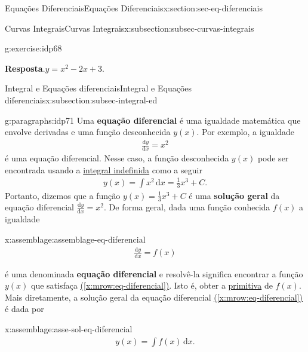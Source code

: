 \documentclass[oneside,10pt,]{article}
\newcommand{\blocktitlefont}{\relax}
\newcommand{\xreffont}{\relax}
\newcommand{\terminology}[1]{\textbf{#1}}
\numberwithin{equation}{section}
\newcommand{\dd}{\mathrm{d}}
\newcommand{\integral}[2]{\displaystyle\int {#1}\,\dd {#2}}
\begin{document}
\begin{sectionptx}{Equações Diferenciais}{}{Equações Diferenciais}{}{}{x:section:sec-eq-diferenciais}
\begin{subsectionptx}{Curvas Integrais}{}{Curvas Integrais}{}{}{x:subsection:subsec-curvas-integrais}
\begin{inlineexercise}{}{g:exercise:idp68}
\par\smallskip%
\noindent\textbf{\blocktitlefont Resposta}.\hypertarget{g:answer:idp70}{}\quad{}\(y=x^2-2x+3\).%
\end{inlineexercise}%
\end{subsectionptx}
%
%
\typeout{************************************************}
\typeout{************************************************}
%
\begin{subsectionptx}{Integral e Equações diferenciais}{}{Integral e Equações diferenciais}{}{}{x:subsection:subsec-integral-ed}
\begin{paragraphs}{}{g:paragraphs:idp71}%
Uma \terminology{equação diferencial}  é uma igualdade matemática que envolve   derivadas e uma função desconhecida \(y(x)\). Por exemplo, a igualdade%
\begin{gather*}
\frac{\dd y}{\dd x} = x^2 
\end{gather*}
é uma equação diferencial. Nesse caso, a função desconhecida \(y(x)\) pode ser encontrada usando a \hyperref[x:mrow:eq-integral-indefinida]{integral indefinida} como a seguir%
\begin{gather*}
y(x) = \integral{x^2}{x}=\frac{1}{3}x^3 +C.
\end{gather*}
Portanto, dizemos que a função \(y(x)=\frac{1}{3}x^3 +C\) é uma \terminology{solução geral} da equação diferencial \(\frac{\dd y}{\dd x} = x^2\). De forma geral, dada uma função conhecida \(f(x)\) a igualdade \begin{assemblage}{}{x:assemblage:assemblage-eq-diferencial}%
%
\begin{gather}
\frac{\dd y}{\dd x} = f(x)\label{x:mrow:eq-diferencial}
\end{gather}
%
\end{assemblage}
 é uma denominada \terminology{equação diferencial} e resolvê-la significa encontrar a função \(y(x)\) que  satisfaça \hyperref[x:mrow:eq-diferencial]{({\xreffont\ref{x:mrow:eq-diferencial}})}. Isto é, obter a \hyperref[x:definition:def-primitiva]{primitiva} de \(f(x)\). Mais diretamente, a solução geral da equação diferencial \hyperref[x:mrow:eq-diferencial]{({\xreffont\ref{x:mrow:eq-diferencial}})} é dada por%
\end{paragraphs}%
\begin{assemblage}{}{x:assemblage:asse-sol-eq-diferencial}%
%
\begin{gather}
y(x)=\integral{f(x)}{x}\text{.}\label{g:mrow:idp72}
\end{gather}
%
\end{assemblage}

\end{subsectionptx}
\end{sectionptx}
\end{document}
